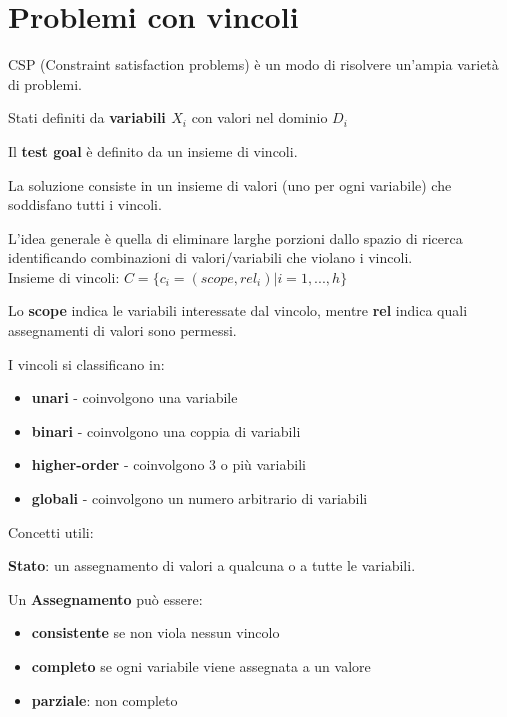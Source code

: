 \newpage

\section{Problemi con vincoli}

CSP (Constraint satisfaction problems) è un modo di risolvere un'ampia varietà di problemi.

Stati definiti da \textbf{ variabili $X_i$ } con valori nel dominio $D_i$

Il \textbf{test goal} è definito da un insieme di vincoli.

La {soluzione} consiste in un insieme di valori (uno per ogni variabile) che
soddisfano tutti i vincoli.

L'idea generale è quella di eliminare larghe porzioni dallo spazio di ricerca
identificando combinazioni di valori/variabili che violano i vincoli.\\

Insieme di vincoli: $C = \{ c_i = (scope,rel_i) | i=1,...,h\}$

Lo \textbf{scope} indica le variabili interessate dal vincolo, mentre \textbf{rel}
indica quali assegnamenti di valori sono permessi.

I vincoli si classificano in:

\begin{itemize}
 \item \textbf{unari} - coinvolgono una variabile
 \item \textbf{binari} - coinvolgono una coppia di variabili
 \item \textbf{higher-order} - coinvolgono 3 o più variabili
 \item \textbf{globali} - coinvolgono un numero arbitrario di variabili
\end{itemize}

Concetti utili:

\textbf{Stato}: un assegnamento di valori a qualcuna o a tutte le variabili.

Un \textbf{Assegnamento} può essere:

\begin{itemize}
 \item \textbf{consistente} se non viola nessun vincolo
 \item \textbf{completo} se ogni variabile viene assegnata a un valore
 \item \textbf{parziale}: non completo
\end{itemize}

